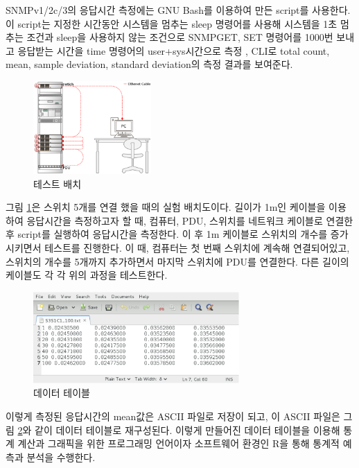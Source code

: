 \documentclass[11pt
  , a4paper
  , article
  , oneside
]{memoir}
\begin{document}
SNMPv1/2c/3의 응답시간 측정에는 GNU Bash를 이용하여 만든 script를 사용한다. 이 script는 지정한 시간동안 시스템을 멈추는 sleep 명령어를 사용해 시스템을 1초 멈추는 조건과 sleep을 사용하지 않는 조건으로 SNMPGET, SET 명령어를 1000번 보내고 응답받는 시간을 time 명령어의 user+sys시간으로 측정 , CLI로 total count, mean, sample deviation, standard deviation의 측정 결과를 보여준다.

\begin{figure}[!htb]
  \centering
  \includegraphics[width=0.4\textwidth]{./images/switch5.eps}
  \caption{테스트 배치}
  \label{fig:switch}   
\end{figure}

그림  \ref{fig:switch}은 스위치 5개를 연결 했을 때의 실험 배치도이다. 길이가 1m인 케이블을 이용하여 응답시간을 측정하고자 할 때, 컴퓨터, PDU, 스위치를 네트워크 케이블로 연결한 후 script를 실행하여 응답시간을 측정한다. 이 후 1m 케이블로 스위치의 개수를 증가시키면서 테스트를 진행한다. 이 때, 컴퓨터는 첫 번째 스위치에 계속해 연결되어있고, 스위치의 개수를 5개까지 추가하면서 마지막 스위치에 PDU를 연결한다. 다른 길이의 케이블도 각 각 위의 과정을 테스트한다. 

\begin{figure}[!htb]
  \centering
  \includegraphics[width=0.7\textwidth]{./images/timetable.eps}
  \caption{데이터 테이블}
  \label{fig:time_table}   
\end{figure}

이렇게 측정된 응답시간의 mean값은 ASCII 파일로 저장이 되고, 이 ASCII 파일은 그림 \ref{fig:time_table}와 같이 데이터 테이블로 재구성된다. 이렇게 만들어진 데이터 테이블을 이용해 통계 계산과 그래픽을 위한 프로그래밍 언어이자 소프트웨어 환경인 R\citep{r}을 통해 통계적 예측과 분석을 수행한다. 
\end{document}
